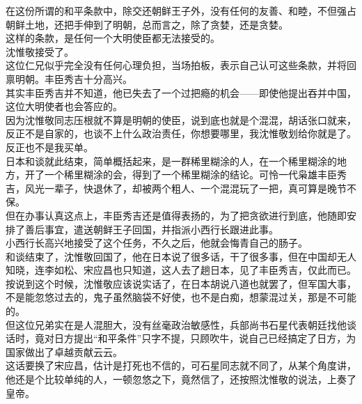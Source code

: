 \begin{multicols}{\theparacolNo}
在这份所谓的和平条款中，除交还朝鲜王子外，没有任何的友善、和睦，不但强占朝鲜土地，还把手伸到了明朝，总而言之，除了贪婪，还是贪婪。\\

这样的条款，是任何一个大明使臣都无法接受的。\\

沈惟敬接受了。\\

这位仁兄似乎完全没有任何心理负担，当场拍板，表示自己认可这些条款，并将回禀明朝。丰臣秀吉十分高兴。\\

其实丰臣秀吉并不知道，他已失去了一个过把瘾的机会——即使他提出吞并中国，这位大明使者也会答应的。\\

因为沈惟敬同志压根就不算是明朝的使臣，说到底也就是个混混，胡话张口就来，反正不是自家的，也谈不上什么政治责任，你想要哪里，我沈惟敬划给你就是了。反正也不是我买单。\\

日本和谈就此结束，简单概括起来，是一群稀里糊涂的人，在一个稀里糊涂的地方，开了一个稀里糊涂的会，得到了一个稀里糊涂的结论。可怜一代枭雄丰臣秀吉，风光一辈子，快退休了，却被两个粗人、一个混混玩了一把，真可算是晚节不保。\\

但在办事认真这点上，丰臣秀吉还是值得表扬的，为了把贪欲进行到底，他随即安排了善后事宜，遣送朝鲜王子回国，并指派小西行长跟进此事。\\

小西行长高兴地接受了这个任务，不久之后，他就会悔青自己的肠子。\\

和谈结束了，沈惟敬回国了，他在日本说了很多话，干了很多事，但在中国却无人知晓，连李如松、宋应昌也只知道，这人去了趟日本，见了丰臣秀吉，仅此而已。\\

按说到这个时候，沈惟敬应该说实话了，在日本胡说八道也就罢了，但军国大事，不是能忽悠过去的，鬼子虽然脑袋不好使，也不是白痴，想蒙混过关，那是不可能的。\\

但这位兄弟实在是人混胆大，没有丝毫政治敏感性，兵部尚书石星代表朝廷找他谈话时，竟对日方提出“和平条件”只字不提，只顾吹牛，说自己已经搞定了日方，为国家做出了卓越贡献云云。\\

这话要换了宋应昌，估计是打死也不信的，可石星同志就不同了，从某个角度讲，他还是个比较单纯的人，一顿忽悠之下，竟然信了，还按照沈惟敬的说法，上奏了皇帝。\\


\end{multicols}
